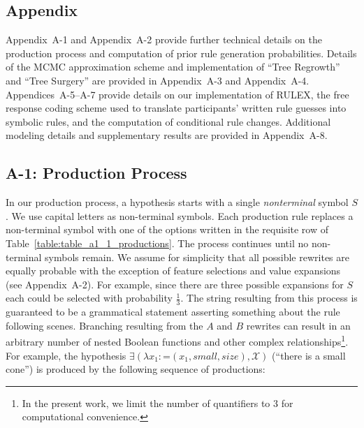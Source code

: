 \documentclass[doc,natbib,floatsintext]{apa7}
\newcommand{\xx}{\mathcal{X}} %
\begin{document}
\begin{appendices}

\renewcommand{\theequation}{A-\arabic{equation}}
\renewcommand{\thetable}{A-\arabic{table}}
\renewcommand{\thefigure}{A-\arabic{figure}}

\setcounter{equation}{0} %
\setcounter{table}{0} %
\setcounter{figure}{0} %

\section{Appendix}

Appendix~A-1 and Appendix~A-2 provide further technical details on the production process and computation of prior rule generation probabilities. Details of the MCMC approximation scheme and implementation of ``Tree Regrowth'' and ``Tree Surgery'' are provided in Appendix~A-3 and Appendix~A-4. Appendices~A-5--A-7 provide details on our implementation of RULEX, the free response coding scheme used to translate participants' written rule guesses into symbolic rules, and the computation of conditional rule changes. Additional modeling details and supplementary results are provided in Appendix~A-8.

\subsection{A-1: Production Process}\label{ap:a1_production_process}

In our production process, a hypothesis starts with a single \emph{nonterminal} symbol $S$.  We use capital letters as non-terminal symbols. Each production rule replaces a non-terminal symbol with one of the options written in the requisite row of Table~\ref{table:table_a1_1_productions}. The process continues until no non-terminal symbols remain. We assume for simplicity that all possible rewrites are equally probable with the exception of feature selections and value expansions (see Appendix~A-2). For example, since there are three possible expansions for \(S\) each could be selected with probability \(\frac{1}{3}\). The string resulting from this process is guaranteed to be a grammatical statement asserting something about the rule following scenes. Branching resulting from the $A$ and $B$ rewrites can result in an arbitrary number of nested Boolean functions and other complex relationships\footnote{In the present work, we limit the number of quantifiers to 3 for computational convenience.}. For example, the hypothesis \(\exists(\lambda x_{1}: \text{=}(x_{1},small,size), \xx)\) (``there is a small cone'') is produced by the following sequence of productions:


\end{appendices}
\end{document}
